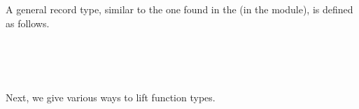 A general  record type, similar to the one found in the \agdastdlib (in the  module), is
defined as follows.
\ccpad
\begin{code}%
\>[0]\AgdaSpace{}%
\AgdaSpace{}%
\AgdaSymbol{\{}\AgdaSpace{}%
\AgdaSpace{}%
\AgdaSymbol{:}\AgdaSpace{}%
\AgdaSymbol{\}}\AgdaSpace{}%
\AgdaSymbol{(}\AgdaSpace{}%
\AgdaSymbol{:}\AgdaSpace{}%
\AgdaSpace{}%
\AgdaSymbol{)}\AgdaSpace{}%
\AgdaSymbol{:}\AgdaSpace{}%
\AgdaSpace{}%
\AgdaSpace{}%
\AgdaSpace{}%
%
\>[50]\<%
\\
\>[0][@{}l@{\AgdaIndent{0}}]%
\>[1]\AgdaSpace{}%
\<%
\\
%
\>[1]\AgdaSpace{}%
\AgdaSpace{}%
\AgdaSymbol{:}\AgdaSpace{}%
\<%
\\
\>[0]\AgdaSpace{}%
\<%
\end{code}
\ccpad
Next, we give various ways to lift function types.
\ccpad
